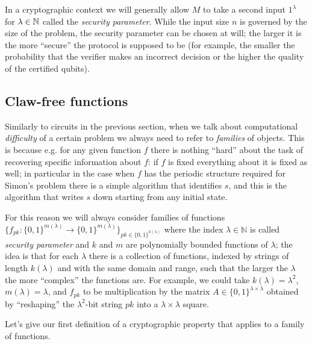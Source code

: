 In a cryptographic context we will generally allow $M$ to take a second input $1^\lambda$ for $\lambda\in \mathbb{N}$ called the \emph{security parameter}. While the input size $n$ is governed by the size of the problem, the security parameter can be chosen at will; the larger it is the more ``secure'' the protocol is supposed to be (for example, the smaller the probability that the verifier makes an incorrect decision or the higher the quality of the certified qubits). 

\subsection{Claw-free functions}

Similarly to circuits in the previous section, when we talk about computational \emph{difficulty} of a certain problem we always need to refer to \emph{families} of objects. This is because e.g. for any given function $f$ there is nothing ``hard'' about the task of recovering specific information about $f$: if $f$ is fixed everything about it is fixed as well; in particular in the case when $f$ has the periodic structure required for Simon's problem there is a simple algorithm that identifies $s$, and this is the algorithm that writes $s$ down starting from any initial state. 

For this reason we will always consider families of functions $\{f_{pk}: \{0,1\}^{m(\lambda)} \to \{0,1\}^{m(\lambda)}\}_{pk\in\{0,1\}^{k(\lambda)}}$ where the index $\lambda \in \mathbb{N}$ is called \emph{security parameter} and $k$ and $m$ are polynomially bounded functions of $\lambda$; the idea is that for each $\lambda$ there is a collection of functions, indexed by strings of length $k(\lambda)$ and with the same domain and range, such that the larger the $\lambda$ the more ``complex'' the functions are. For example, we could take $k(\lambda)=\lambda^2$, $m(\lambda)=\lambda$, and $f_{pk}$ to be multiplication by the matrix $A\in\{0,1\}^{\lambda\times \lambda}$ obtained by ``reshaping'' the $\lambda^2$-bit string $pk$ into a $\lambda\times\lambda$ square. 

Let's give our first definition of a cryptographic property that applies to a family of functions. 


